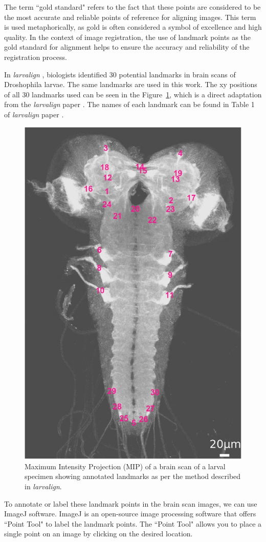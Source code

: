 \documentclass{book}
\begin{document}
	The term ``gold standard" refers to the fact that these points are considered to be the most accurate and reliable points of reference for aligning images. This term is used metaphorically, as gold is often considered a symbol of excellence and high quality. In the context of image registration, the use of landmark points as the gold standard for alignment helps to ensure the accuracy and reliability of the registration process.
	
	In \textit{larvalign} \cite{larvalign}, biologists identified 30 potential landmarks in brain scans of Droshophila larvae. The same landmarks are used in this work. The xy positions of all 30 landmarks used can be seen in the Figure~\ref{fig:landmark_annotations}, which is a direct adaptation from the \emph{larvalign} paper \cite{larvalign}. The names of each landmark can be found in Table 1 of \emph{larvalign} paper \cite{larvalign}.
	
	\begin{figure}[h!]
		\centering
		\includegraphics[width=0.5\columnwidth]{resources/chapter3/landmarks.jpg}
		\caption{Maximum Intensity Projection (MIP) of a brain scan of a larval specimen showing annotated landmarks as per the method described in \textit{larvalign}. \cite{larvalign}}
		\label{fig:landmark_annotations}
	\end{figure}
	
	To annotate or label these landmark points in the brain scan images, we can use ImageJ software. ImageJ is an open-source image processing software that offers ``Point Tool" to label the landmark points. The ``Point Tool" allows you to place a single point on an image by clicking on the desired location.
	
\end{document}
